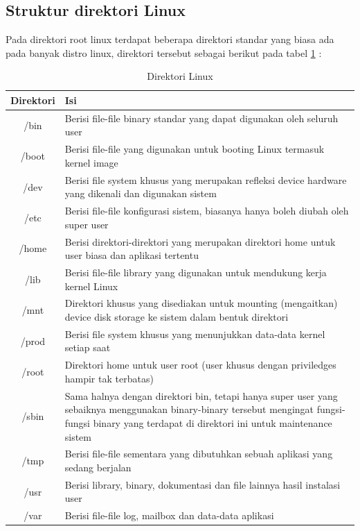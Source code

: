 \subsection{Struktur direktori Linux}
Pada direktori root linux terdapat beberapa direktori standar yang biasa ada pada banyak distro linux, direktori tersebut sebagai berikut pada tabel \ref{direktori} :
\begin{table}[h]
		\caption{Direktori Linux}
		\label{direktori}
			\begin{tabular}{|c|l|}
			\hline
			\textbf{Direktori}& \textbf{Isi} \\
			\hline
			/bin&Berisi file-file binary standar yang dapat digunakan oleh seluruh user \\
			\hline
			/boot&Berisi file-file yang digunakan untuk booting Linux termasuk kernel image\\
			\hline
			/dev& Berisi file system khusus yang merupakan refleksi device hardware yang dikenali dan digunakan sistem \\
			\hline
			/etc&Berisi file-file konfigurasi sistem, biasanya hanya boleh diubah oleh super user\\
			\hline
			/home&Berisi direktori-direktori yang merupakan direktori home untuk user biasa dan aplikasi tertentu\\
			\hline
			/lib&Berisi file-file library yang digunakan untuk mendukung kerja kernel Linux\\
			\hline
			/mnt&Direktori khusus yang disediakan untuk mounting (mengaitkan) device disk storage ke sistem dalam bentuk direktori \\
			\hline
			/prod&Berisi file system khusus yang menunjukkan data-data kernel setiap saat\\
			\hline
			/root&Direktori home untuk user root (user khusus dengan priviledges hampir tak terbatas)\\
			\hline
			/sbin&Sama halnya dengan direktori bin, tetapi hanya super user yang sebaiknya menggunakan binary-binary tersebut mengingat fungsi-fungsi binary yang terdapat di direktori ini untuk maintenance sistem\\
			\hline
			/tmp&Berisi file-file sementara yang dibutuhkan sebuah aplikasi yang sedang berjalan\\
			\hline
			/usr&Berisi library, binary, dokumentasi dan file lainnya hasil instalasi user\\
			\hline
			/var&Berisi file-file log, mailbox dan data-data aplikasi\\
			\hline
		\end{tabular}
		\end{table}

